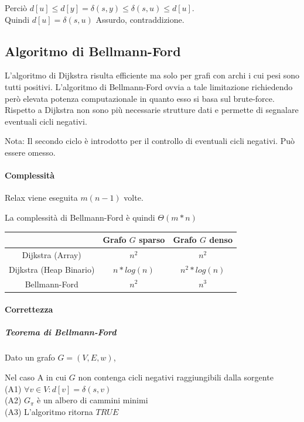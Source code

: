 \documentclass[11pt,a4paper,twoside,openright]{book}
\let\oldparagraph\paragraph
\renewcommand{\paragraph}[1]{\oldparagraph{#1}\mbox{}}
\let\oldsubparagraph\subparagraph
\renewcommand{\subparagraph}[1]{\oldsubparagraph{#1}\mbox{}}
\begin{document}
{{Perciò $d[u] \leq d[y] = \delta(s,y) \leq \delta(s,u) \leq d[u]$. \\ Quindi $d[u]= \delta(s,u)$ Assurdo, contraddizione.


\subsection{Algoritmo di Bellmann-Ford}

{L'algoritmo di Dijkstra risulta efficiente ma solo per grafi con archi i cui pesi sono tutti positivi. L'algoritmo di Bellmann-Ford ovvia a tale limitazione richiedendo però elevata potenza computazionale in quanto esso si basa sul brute-force. Rispetto a Dijkstra non sono più necessarie strutture dati e permette di segnalare eventuali cicli negativi.}



Nota: Il secondo ciclo è introdotto per il controllo di eventuali cicli negativi. Può essere omesso.

\paragraph{Complessità}

Relax viene eseguita $m(n-1)$ volte.

La complessità di Bellmann-Ford è quindi $\Theta(m*n)$

\begin{tabular}{|c|c|c|}
\hline 
  & Grafo $G$ sparso & Grafo $G$ denso \\ 
\hline 
Dijkstra (Array) & $n^2$ & $n^2$ \\ 
\hline 
Dijkstra (Heap Binario) & $n*log(n)$ & $n^2*log(n)$ \\ 
\hline 
Bellmann-Ford & $n^2$ & $n^3$ \\ 
\hline 
\end{tabular} 

\paragraph{Correttezza}

\subparagraph{Teorema di Bellmann-Ford}

Dato un grafo $G=(V,E,w)$, 

Nel caso A in cui $G$ non contenga cicli negativi raggiungibili dalla sorgente\\
(A1) $\forall v \in V : d[v] = \delta(s,v)$ \\
(A2) $G_\pi$ è un albero di cammini minimi\\
(A3) L'algoritmo ritorna $TRUE$

}}
\end{document}
